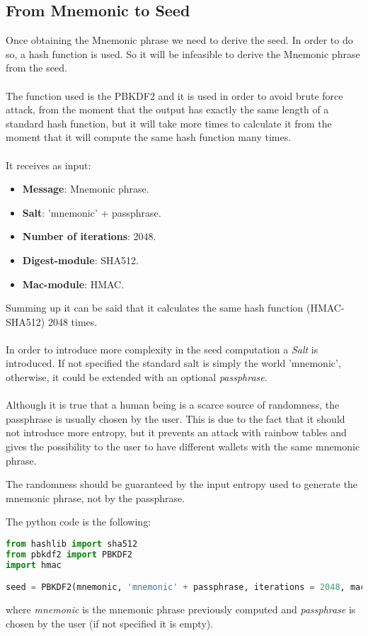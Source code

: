 \subsection{From Mnemonic to Seed}
Once obtaining the Mnemonic phrase we need to derive the seed. In order to do so, a hash function is used. So it will be infeasible to derive the Mnemonic phrase from the seed.
\\ \\
The function used is the PBKDF2 and it is used in order to avoid brute force attack, from the moment that the output has exactly the same length of a standard hash function, but it will take more times to calculate it from the moment that it will compute the same hash function many times.
\\ \\
It receives as input:
\begin{itemize}[label=$\odot$]
	\item \textbf{Message}: Mnemonic phrase.
	\item \textbf{Salt}: 'mnemonic' + passphrase.
	\item \textbf{Number of iterations}: 2048.
	\item \textbf{Digest-module}: SHA512.
	\item \textbf{Mac-module}: HMAC.
\end{itemize}
Summing up it can be said that it calculates the same hash function (HMAC-SHA512) 2048 times.
\\ \\
In order to introduce more complexity in the seed computation a \textit{Salt} is introduced. If not specified the standard salt is simply the world 'mnemonic', otherwise, it could be extended with an optional \textit{passphrase}.
\\ \\
Although it is true that a human being is a scarce source of randomness, the passphrase is usually chosen by the user. This is due to the fact that it should not introduce more entropy, but it prevents an attack with rainbow tables and gives the possibility to the user to have different wallets with the same mnemonic phrase.
\begin{remark}
	The randomness should be guaranteed by the input entropy used to generate the mnemonic phrase, not by the passphrase.
\end{remark}
The python code is the following:
\begin{lstlisting}[language=Python]
from hashlib import sha512
from pbkdf2 import PBKDF2
import hmac

seed = PBKDF2(mnemonic, 'mnemonic' + passphrase, iterations = 2048, macmodule = hmac, digestmodule = sha512).read(64)
\end{lstlisting}
where \textit{mnemonic} is the mnemonic phrase previously computed and \textit{passphrase} is chosen by the user (if not specified it is empty).

